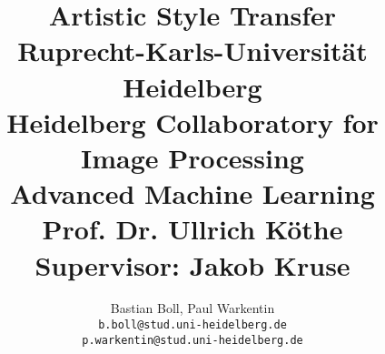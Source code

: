 
\title{%
  {\LARGE \textbf{Artistic Style Transfer}} \\[0.5cm]
  {\large Ruprecht-Karls-Universität Heidelberg} \\
  {\large Heidelberg Collaboratory for Image Processing} \\[0.5cm]
  {\large Advanced Machine Learning} \\[-0.2cm]
  {\large Prof. Dr. Ullrich Köthe} \\
  {\large Supervisor: Jakob Kruse}
}

\author{%
  Bastian Boll, Paul Warkentin \\
  {\tt\small b.boll@stud.uni-heidelberg.de} \\
  {\tt\small p.warkentin@stud.uni-heidelberg.de}
}

\maketitle

